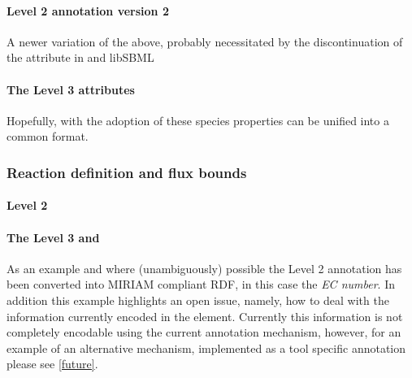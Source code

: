 \paragraph{\SBML Level 2 \Species annotation version 2}
A newer variation of the above, probably necessitated by the discontinuation of the  attribute in \SBML and \textsf{libSBML}
%

\paragraph{The \SBML Level 3 \Species attributes}
Hopefully, with the adoption of \SBML \FBC these species properties can be unified into a common format.
%

\subsubsection*{Reaction definition and flux bounds}

\paragraph{\SBML Level 2 \Reaction}
%

\paragraph{The \SBML Level 3 \Reaction and \FluxBound}

As an example and where (unambiguously) possible the \SBML Level 2 annotation has been converted into MIRIAM compliant RDF, in this case the \textit{EC number}. In addition this example highlights an open issue, namely, how to deal with the information currently encoded in the \Notes element. Currently this information is not completely encodable using the current \SBML annotation mechanism, however, for an example of an alternative mechanism, implemented as a tool specific annotation please see \ref{future}.
%
%
